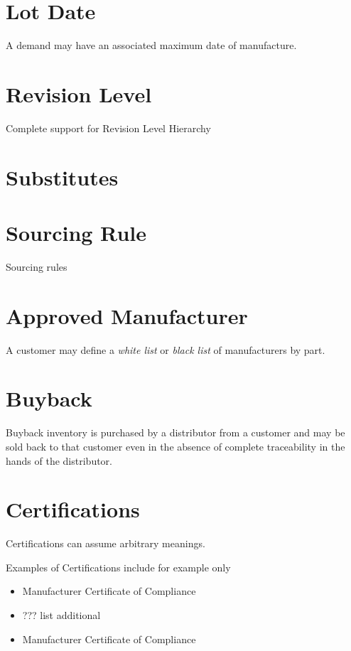 \documentclass[letterpaper,10pt,english]{sphinxmanual}
\begin{document}
\section{Lot Date}
\label{APS/EligibilityTests:lot-date}
A demand may have an associated maximum date of manufacture.


\section{Revision Level}
\label{APS/EligibilityTests:revision-level}
Complete support for Revision Level Hierarchy


\section{Substitutes}
\label{APS/EligibilityTests:substitutes}

\section{Sourcing Rule}
\label{APS/EligibilityTests:sourcing-rule}
Sourcing rules


\section{Approved Manufacturer}
\label{APS/EligibilityTests:id2}
A customer may define a \emph{white list} or \emph{black list} of manufacturers by
part.


\section{Buyback}
\label{APS/EligibilityTests:id3}
Buyback inventory is purchased by a distributor from a customer and may
be sold back to that customer even in the absence of complete
traceability in the hands of the distributor.


\section{Certifications}
\label{APS/EligibilityTests:id4}
Certifications can assume arbitrary meanings.

Examples of Certifications include for example only
\begin{itemize}
\item {} 
Manufacturer Certificate of Compliance

\item {} 
??? list additional

\item {} 
Manufacturer Certificate of Compliance

\end{itemize}
\end{document}
